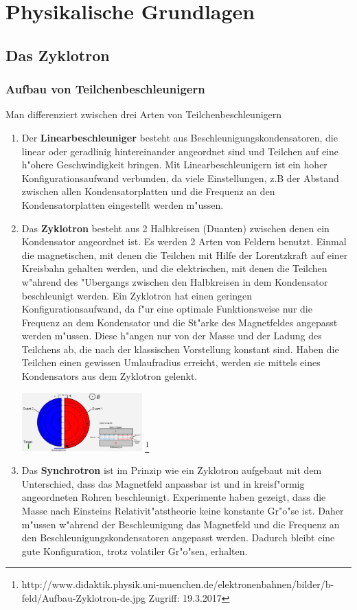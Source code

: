 \documentclass[14pt, a4paper]{report}
\begin{document}
\part{Physikalische Grundlagen}
\chapter{Das Zyklotron}
\section{Aufbau von Teilchenbeschleunigern}
Man differenziert zwischen drei Arten von Teilchenbeschleunigern \footnotemark
{}
\begin{enumerate}
\item
Der \textbf{Linearbeschleuniger} besteht aus Beschleunigungskondensatoren, die linear
oder geradlinig hintereinander angeordnet sind und Teilchen auf 
eine h"ohere Geschwindigkeit bringen. Mit Linearbeschleunigern ist ein hoher
Konfigurationsaufwand verbunden, da viele Einstellungen, z.B der Abstand zwischen allen
Kondensatorplatten und die Frequenz an den Kondensatorplatten eingestellt werden m"ussen.
\item \label{ZyklotronBeschreibungAufbau}
Das \textbf{Zyklotron} besteht aus 2 Halbkreisen (Duanten) zwischen denen ein Kondensator 
angeordnet ist. Es werden 2 Arten von Feldern benutzt. Einmal die magnetischen, mit 
denen die 
Teilchen mit Hilfe der Lorentzkraft auf einer Kreisbahn
gehalten werden, und die elektrischen, 
mit denen die Teilchen w"ahrend des "Ubergangs zwischen den Halbkreisen in dem 
Kondensator beschleunigt werden. Ein Zyklotron hat einen geringen 
Konfigurationsaufwand, da f"ur eine optimale Funktionsweise nur die Frequenz an dem 
Kondensator und die St"arke des Magnetfeldes angepasst werden m"ussen. Diese h"angen nur von der 
Masse und der Ladung des Teilchens ab, die nach der klassischen Vorstellung konstant
sind. Haben die Teilchen einen gewissen Umlaufradius erreicht, werden sie mittels eines 
Kondensators aus dem Zyklotron gelenkt.

\includegraphics[height=85px]{doc/Aufbau-Zyklotron-de.jpg}
\footnote{http://www.didaktik.physik.uni-muenchen.de/elektronenbahnen/bilder/b-feld/Aufbau-Zyklotron-de.jpg Zugriff: 19.3.2017}

\item
Das \textbf{Synchrotron} ist im Prinzip wie ein Zyklotron aufgebaut mit dem 
Unterschied, dass das Magnetfeld anpassbar ist und in kreisf"ormig angeordneten Rohren 
beschleunigt. Experimente haben gezeigt, dass die
Masse nach Einsteins Relativit"atstheorie keine konstante Gr"o"se ist. Daher 
m"ussen w"ahrend der Beschleunigung das Magnetfeld und die Frequenz an den 
Beschleunigungskondensatoren angepasst werden. Dadurch bleibt eine gute 
Konfiguration, trotz  volatiler Gr"o"sen, erhalten. \label{synchrotron}
\end{enumerate}
\end{document}
